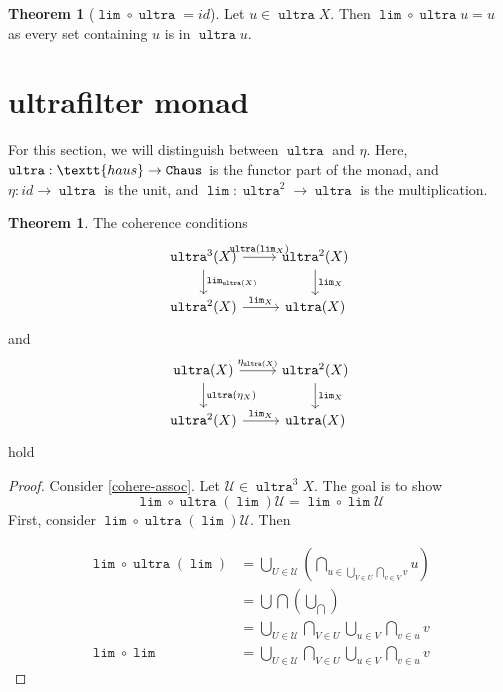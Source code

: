 \documentclass[10pt]{scrartcl}
\newcounter{thms}
\numberwithin{thms}{section}
\theoremstyle{definition}
\newtheorem{theorem}[thms]{Theorem}
\renewcommand{\lim}{\operatorname{\mathtt{lim}}}
\newcommand{\ultra}{\operatorname{\mathtt{ultra}}}
\begin{document}
\begin{theorem}[$\lim \circ \ultra = id$]
  Let $u\in \ultra X$. Then
  $\lim\circ  \ultra u = u$ as every set containing $u$ is in $\ultra u$. 
\end{theorem}

\section{ultrafilter monad}
For this section, we will distinguish between $\ultra$ and $\eta$. Here, $\ultra:\textt{haus}\to \texttt{Chaus}$ is the functor part of the monad, and $\eta:id\to \ultra$ is the unit, and $\lim:\ultra^2\to \ultra$ is the multiplication. 
\begin{theorem}
  The coherence conditions
  \begin{equation}
    \label{cohere-assoc}
    \begin{tikzcd}
      \ultra^3(X)\rar{\ultra(\lim_X)}\dar{\lim_{\ultra(X)}} & \ultra^2(X)\dar{\lim_X}  \\
      \ultra^2(X)\rar{\lim_X}& \ultra(X)
    \end{tikzcd}
  \end{equation}
  and 
  \begin{equation}
    \label{cohere-id}
    \begin{tikzcd}
      \ultra(X)\rar{\eta_{\ultra(X)}}\dar{\ultra(\eta_X)}& \ultra^2(X)\dar{\lim_X}\\
      \ultra^2(X)\rar{\lim_X}&\ultra(X)
    \end{tikzcd}
\end{equation}
hold
\end{theorem}
\begin{proof}
  Consider \cref{cohere-assoc}. Let $\mathcal{U}\in \ultra^3 X$. The goal is to show \[\lim\circ \ultra(\lim) \mathcal U = \lim\circ\lim \mathcal U\]
  First, consider $\lim \circ \ultra(\lim)\mathcal U$. 
  Then

  \begin{align*}
  \lim \circ \ultra(\lim) &= \bigcup_{U\in\mathcal U}\left(\bigcap_{u\in \bigcup_{V\in U} \bigcap_{v\in V} v}u \right) \\
                          &= \bigcup\bigcap\left(\bigcup_{\bigcap}\right) \\
                          &= \bigcup_{U\in\mathcal U}\bigcap_{V\in U} \bigcup_{u\in V}\bigcap_{v\in u} v \\
    \lim\circ\lim &= \bigcup_{U\in\mathcal U}\bigcap_{V\in U} \bigcup_{u\in V}\bigcap_{v\in u} v
  \end{align*}
\end{proof}
\end{document}
